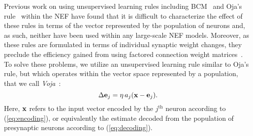 Previous work on using unsupervised learning rules including BCM~\citep{bekolay2013} and Oja's rule~\citep{trujillo2014} within the NEF have found that it is difficult to characterize the effect of these rules in terms of the vector represented by the population of neurons and, as such, neither have been used within any large-scale NEF models.
Moreover, as these rules are formulated in terms of individual synaptic weight changes, they preclude the efficiency gained from using factored connection weight matrices~\citep{mundy2015}.
%
To solve these problems, we utilize an unsupervised learning rule similar to Oja's rule, but which operates within the vector space represented by a population, that we call {\it Voja}~\citep{voelker2014a}:
%
\begin{equation}
  \label{eq:voja}
  \Delta \mathbf{e}_j = \eta \, a_j (\mathbf{x} - \mathbf{e}_j) .
\end{equation}
%
Here, $\mathbf{x}$ refers to the input vector encoded by the $j^\mathrm{th}$ neuron according to (\ref{eq:encoding}), or equivalently the estimate decoded from the population of presynaptic neurons  according to (\ref{eq:decoding}).

